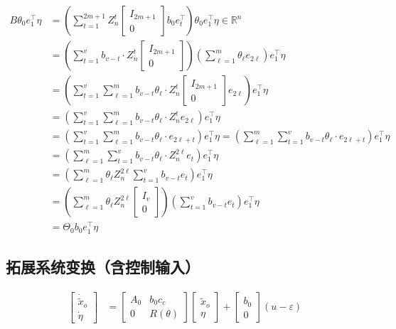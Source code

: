 \documentclass[12pt,a4paper]{article}
\begin{document}
\begin{align*}
B\theta_0 e_1^\top \eta
&= \left(\sum_{t=1}^{2m+1} Z_n^{t} \begin{bmatrix} I_{2m+1} \\ 0 \end{bmatrix} b_0 e_{t}^\top \right)
\theta_0 e_1^\top \eta \in \mathbb{R}^{n} \\
&= \left(\sum_{t=1}^{v} b_{v-t}\cdot Z_n^{t} \begin{bmatrix} I_{2m+1} \\ 0 \end{bmatrix} \right)
\left(\sum_{\ell=1}^{m} \theta_\ell e_{2\ell} \right)e_1^\top \eta \\
&= \left(\sum_{t=1}^{v} \sum_{\ell=1}^{m}
b_{v-t}\theta_\ell\cdot Z_n^{t} \begin{bmatrix} I_{2m+1} \\ 0 \end{bmatrix} e_{2\ell} \right) e_1^\top \eta \\
&= \left(\sum_{t=1}^{v} \sum_{\ell=1}^{m}
b_{v-t}\theta_\ell\cdot Z_n^{t} e_{2\ell} \right) e_1^\top \eta \\
&= \left(\sum_{t=1}^{v} \sum_{\ell=1}^{m}
b_{v-t}\theta_\ell\cdot e_{2\ell+t} \right) e_1^\top \eta
= \left( \sum_{\ell=1}^{m} \sum_{t=1}^{v}
b_{v-t}\theta_\ell\cdot e_{2\ell+t} \right) e_1^\top \eta \\
&= \left( \sum_{\ell=1}^{m} \sum_{t=1}^{v}
b_{v-t}\theta_\ell\cdot Z_n^{2\ell} e_{t} \right) e_1^\top \eta \\
&= \left( \sum_{\ell=1}^{m} \theta_\ell Z_n^{2\ell} \sum_{t=1}^{v} b_{v-t} e_{t} \right) e_1^\top \eta \\
&= \left( \sum_{\ell=1}^{m} \theta_\ell Z_n^{2\ell} \begin{bmatrix} I_v \\ 0 \end{bmatrix} \right)
\left(\sum_{t=1}^{v} b_{v-t} e_{t} \right) e_1^\top \eta \\
&= \Theta_0 b_0 e_1^\top \eta
\end{align*}

\subsection{拓展系统变换（含控制输入）}

\begin{align*}
\begin{bmatrix} \dot{\tilde{x}}_o \\ \dot{\eta} \end{bmatrix}
&= \begin{bmatrix} A_0 & b_0c_c \\ 0 & R(\theta) \end{bmatrix}
\begin{bmatrix} \tilde{x}_o \\ \eta \end{bmatrix} +
\begin{bmatrix} b_0 \\ 0 \end{bmatrix} (u-\varepsilon)
\end{align*}
\end{document}
